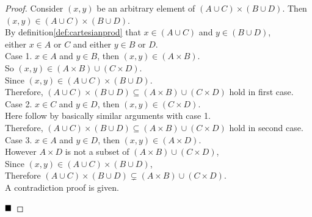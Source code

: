 \documentclass{article}
\begin{document}
\begin{proof}
Consider $(x,y)$ be an arbitrary element of $(A \cup C) \times (B \cup D)$. Then $(x,y) \in (A \cup C) \times (B \cup D)$.\\
By definition\ref{def:cartesianprod} that $x \in (A \cup C)$ and $y \in (B \cup D)$,\\
either $x \in A$ or $C$ and either $y \in B$ or $D$.\\

Case 1. $x \in A$ and $y \in B$, then $(x,y) \in (A \times B)$.\\
So $(x,y) \in (A \times B) \cup (C \times D)$.\\
Since $(x,y) \in (A \cup C) \times (B \cup D)$.\\
Therefore, $(A \cup C) \times (B \cup D) \subseteq (A \times B) \cup (C \times D)$ hold in first case.\\

Case 2. $x \in C$ and $y \in D$, then $(x,y) \in (C \times D)$.\\
Here follow by basically similar arguments with case 1.\\
Therefore, $(A \cup C) \times (B \cup D) \subseteq (A \times B) \cup (C \times D)$ hold in second case.\\

Case 3. $x \in A$ and $y \in D$, then $(x,y) \in (A \times D)$.\\
However $A \times D$ is not a subset of $(A \times B) \cup (C \times D)$,\\
Since $(x,y) \in (A \cup C) \times (B \cup D)$,\\
Therefore $(A \cup C) \times (B \cup D) \varsubsetneq (A \times B) \cup (C \times D)$.\\
\newline
A contradiction proof is given.

$\hfill\blacksquare$
\end{proof}
\end{document}

